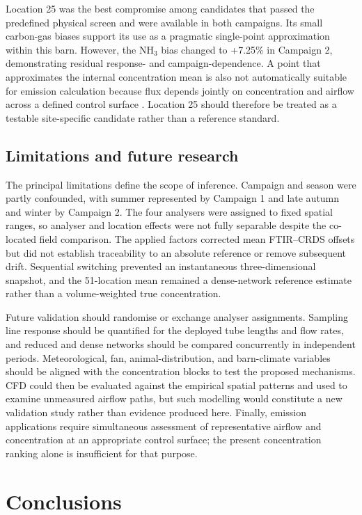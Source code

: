 \documentclass[12pt,a4paper]{article}
\begin{document}
Location 25 was the best compromise among candidates that passed the
predefined physical screen and were available in both campaigns. Its small
carbon-gas biases support its use as a pragmatic single-point approximation
within this barn. However, the \(\mathrm{NH_3}\) bias changed to +7.25\% in
Campaign 2, demonstrating residual response- and campaign-dependence. A point
that approximates the internal concentration mean is also not automatically
suitable for emission calculation because flux depends jointly on
concentration and airflow across a defined control surface
\citep{Calvet2013,Ogink2013}. Location 25 should therefore be treated as a
testable site-specific candidate rather than a reference standard.

\subsection{Limitations and future research}

The principal limitations define the scope of inference. Campaign and season
were partly confounded, with summer represented by Campaign 1 and late autumn
and winter by Campaign 2. The four analysers were assigned to fixed spatial
ranges, so analyser and location effects were not fully separable despite the
co-located field comparison. The applied factors corrected mean FTIR--CRDS
offsets but did not establish traceability to an absolute reference or remove
subsequent drift. Sequential switching prevented an instantaneous
three-dimensional snapshot, and the 51-location mean remained a dense-network
reference estimate rather than a volume-weighted true concentration.

Future validation should randomise or exchange analyser assignments. Sampling
line response should be quantified for the deployed tube lengths and flow
rates, and reduced and dense networks should be compared concurrently in
independent periods.
Meteorological, fan, animal-distribution, and barn-climate variables should be
aligned with the concentration blocks to test the proposed mechanisms.
CFD could then be evaluated against the empirical spatial patterns and used to
examine unmeasured airflow paths, but such modelling would constitute a new
validation study rather than evidence produced here. Finally, emission
applications require simultaneous assessment of representative airflow and
concentration at an appropriate control surface; the present concentration
ranking alone is insufficient for that purpose.

\section{Conclusions}
\end{document}
